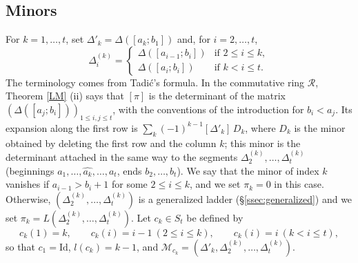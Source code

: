 \documentclass[a4paper,12pt,leqno]{amsart}
\newcommand{\caM}{\mathcal{M}}
\newcommand{\caR}{\mathcal{R}}
\theoremstyle{plain}
\theoremstyle{definition}
\theoremstyle{definition}
\newcommand{\Id}{\mathrm{Id}}
\begin{document}
\subsection{Minors}\label{ssec:minors}
For $k=1,\ldots,t$, set $\Delta'_k=\Delta([a_k;b_1])$ and, for $i=2,\ldots,t$,
\[\Delta^{(k)}_i=\begin{cases}\Delta([a_{i-1};b_i]) & \text{if } 2\leq i\leq k,\\ \Delta([a_i;b_i])
& \text{if } k<i\leq t.\end{cases}\]
The terminology comes from Tadi\'c's formula. In the commutative ring $\caR$, Theorem \ref{LM} (ii)
says that $[\pi]$ is the determinant of the matrix $(\Delta([a_j;b_i]))_{1\leq i,j\leq t}$, with the
conventions of the introduction for $b_i<a_j$. Its expansion along the first row is
$\sum_k(-1)^{k-1}[\Delta'_k]\,D_k$, where $D_k$ is the minor obtained by deleting the first row and the
column $k$; this minor is the determinant attached in the same way to the segments
$\Delta^{(k)}_2,\ldots,\Delta^{(k)}_t$ (beginnings $a_1,\ldots,\widehat{a_k},\ldots,a_t$, ends
$b_2,\ldots,b_t$). We say that the minor of index $k$ vanishes if $a_{i-1}>b_i+1$ for some $2\leq i\leq k$, and
we set $\pi_k=0$ in this case. Otherwise, $(\Delta^{(k)}_2,\ldots,\Delta^{(k)}_t)$ is a generalized
 ladder (\S\ref{ssec:generalized}) and we set $\pi_k=L(\Delta^{(k)}_2,\ldots,\Delta^{(k)}_t)$. Let
 $c_k\in S_t$ be defined by
\[c_k(1)=k,\qquad c_k(i)=i-1\ (2\leq i\leq k),\qquad c_k(i)=i\ (k<i\leq t),\]
so that $c_1=\Id$, $l(c_k)=k-1$, and $\caM_{c_k}=(\Delta'_k,\Delta^{(k)}_2,\ldots,\Delta^{(k)}_t)$.
\end{document}
